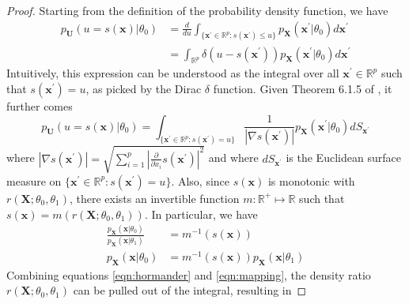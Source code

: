 \documentclass[12pt]{article}
\numberwithin{equation}{section}
\theoremstyle{plain}
\begin{document}
\begin{proof}
Starting from the definition of the probability density function, we have
\begin{align}
p_{\mathbf{U}}(u=s(\mathbf{x})|\theta_0) &= \frac{d}{du}  \int_{\{\mathbf{x}^\prime \in \mathbb{R}^p : s(\mathbf{x}^\prime) \leq u\}} p_\mathbf{X}(\mathbf{x}^\prime|\theta_0) d\mathbf{x}^\prime \nonumber \\
&= \int_{\mathbb{R}^p} \delta(u - s(\mathbf{x}^\prime)) p_\mathbf{X}(\mathbf{x}^\prime|\theta_0) d\mathbf{x}^\prime
\end{align}
Intuitively, this expression can be understood as the integral
over all $\mathbf{x}^\prime \in \mathbb{R}^p$ such that $s(\mathbf{x}^\prime) = u$, as picked
by the Dirac $\delta$ function. Given Theorem 6.1.5 of \citet{Hrmander1990},
it further comes
\begin{equation}
p_{\mathbf{U}}(u=s(\mathbf{x})|\theta_0) = \int_{\{\mathbf{x}^\prime \in \mathbb{R}^p : s(\mathbf{x}^\prime) = u\}} \frac{1}{|\nabla s(\mathbf{x}^\prime)|} p_\mathbf{X}(\mathbf{x}^\prime|\theta_0) dS_{\mathbf{x}^\prime} \label{eqn:hormander}
\end{equation}
where $|\nabla s(\mathbf{x}^\prime)| = \sqrt{\sum_{i=1}^p |\frac{\partial}{\partial x_i} s(\mathbf{x}^\prime)|^2}$
and where $dS_{\mathbf{x}^\prime}$ is the Euclidean surface measure on $\{\mathbf{x}^\prime \in \mathbb{R}^p : s(\mathbf{x}^\prime) = u\}$.
Also, since $s(\mathbf{x})$ is monotonic with
$r(\mathbf{X}; \theta_0, \theta_1)$,
there exists an invertible function $m:\mathbb{R}^+ \mapsto \mathbb{R}$ such
that $s(\mathbf{x}) = m(r(\mathbf{X}; \theta_0, \theta_1))$.
In particular, we have
\begin{align}
\frac{p_\mathbf{X}(\mathbf{x}|\theta_0)}{p_\mathbf{X}(\mathbf{x}|\theta_1)} &= m^{-1}(s(\mathbf{x})) \nonumber \\
p_\mathbf{X}(\mathbf{x}|\theta_0) &= m^{-1}(s(\mathbf{x})) p_\mathbf{X}(\mathbf{x}|\theta_1) \label{eqn:mapping}
\end{align}
Combining equations \ref{eqn:hormander} and \ref{eqn:mapping}, the density ratio $r(\mathbf{X}; \theta_0, \theta_1)$ can be pulled out of the integral, resulting in

\end{proof}
\end{document}
